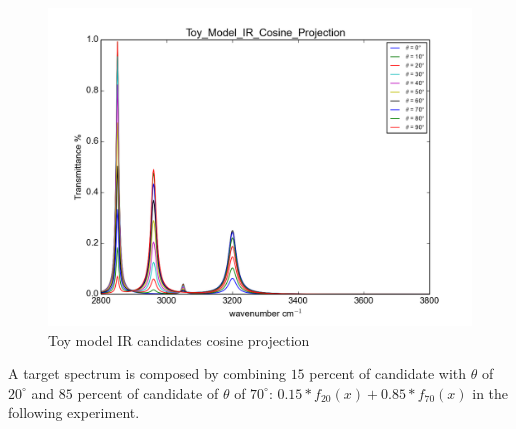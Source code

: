 

\begin{figure}[!ht] \label{fig:3.1}
\centering
\includegraphics[scale=0.4]{Figures/Toy_Model_IR_Cosine_Projection.png} 
\caption{Toy model IR candidates cosine projection} 
\end{figure}

A target spectrum is composed by combining $15$ percent of candidate with $\theta$ of $20^{\circ}$ and $85$ percent of candidate of $\theta$ of $70^{\circ}$: $0.15*f_{20}(x) + 0.85*f_{70}(x)$ in the following experiment. \\

